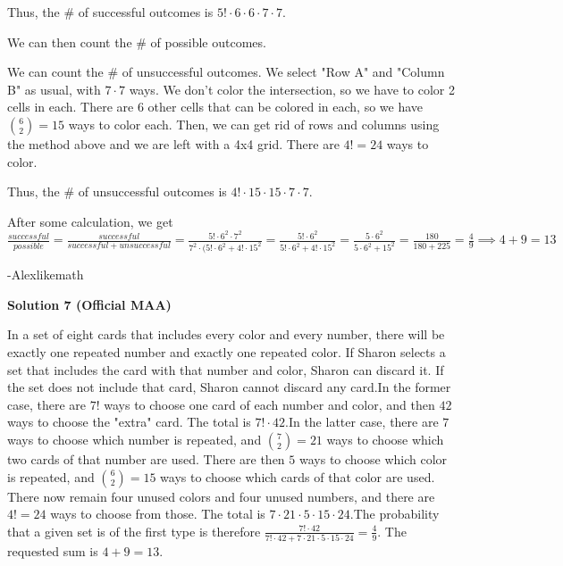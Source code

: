 \begin{enumerate}
 Thus, the \# of successful outcomes is $5! \cdot 6 \cdot 6 \cdot 7 \cdot 7$.

 We can then count the \# of possible outcomes. 

 We can count the \# of unsuccessful outcomes. We select "Row A" and "Column B" as usual, with $7 \cdot 7$ ways. We don't color the intersection, so we have to color 2 cells in each. There are 6 other cells that can be colored in each, so we have ${6 \choose 2} = 15$ ways to color each. Then, we can get rid of rows and columns using the method above and we are left with a 4x4 grid. There are $4! = 24$ ways to color. 

 Thus, the \# of unsuccessful outcomes is $4! \cdot 15 \cdot 15 \cdot 7 \cdot 7$.

 After some calculation, we get $\frac{successful}{possible} = \frac{successful}{successful+unsuccessful} = \frac{5! \cdot 6^2 \cdot 7^2}{7^2 \cdot(5! \cdot 6^2 + 4! \cdot 15^2} = \frac{5! \cdot 6^2}{5! \cdot 6^2 +4! \cdot 15^2} = \frac{5 \cdot 6^2}{5 \cdot 6^2 + 15^2} = \frac{180}{180+225} = \frac{4}{9} \implies 4+9 = \boxed{13}$

 -Alexlikemath

 



\textbf{Solution 7 (Official MAA)}

In a set of eight cards that includes every color and every number, there will be exactly one repeated number and exactly one repeated color. If Sharon selects a set that includes the card with that number and color, Sharon can discard it. If the set does not include that card, Sharon cannot discard any card.In the former case, there are $7!$ ways to choose one card of each number and color, and then $42$ ways to choose the "extra" card. The total is $7!\cdot 42$.In the latter case, there are $7$ ways to choose which number is repeated, and $\binom{7}{2} = 21$ ways to choose which two cards of that number are used. There are then $5$ ways to choose which color is repeated, and $\binom{6}{2} = 15$ ways to choose which cards of that color are used. There now remain four unused colors and four unused numbers, and there are $4! = 24$ ways to choose from those. The total is $7 \cdot 21 \cdot 5 \cdot 15 \cdot 24$.The probability that a given set is of the first type is therefore $\frac{7! \cdot 42}{7! \cdot 42+7 \cdot 21 \cdot 5 \cdot 15 \cdot 24} = \frac{4}{9}.$ The requested sum is $4 + 9 = 13$.

 




\end{enumerate}
